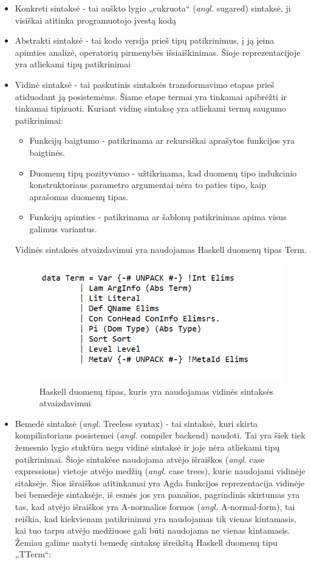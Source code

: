 \documentclass{VUMIFPSkursinis}
\begin{document}
\begin{itemize}
	\item Konkreti sintaksė - tai auškto lygio „cukruota“ (\textit{angl.} sugared) sintaksė, ji visiškai atitinka programuotojo įvestą kodą
	\item Abstrakti sintaksė - tai kodo versija prieš tipų patikrinimus, į ją įeina apimties analizė, operatorių pirmenybės išsiaiškinimas. Šioje reprezentacijoje yra atliekami tipų patikrinimai
	\item Vidinė sintaksė - tai paskutinis sintaksės transformavimo etapas prieš atiduodant ją posistemėms. Šiame etape termai yra tinkamai apibrėžti ir tinkamai tipizuoti. Kuriant vidinę sintaksę yra atliekami termų saugumo patikrinimai:
	\begin{itemize}
		\item Funkcijų baigtumo - patikrinama ar rekursiškai aprašytos funkcijos yra baigtinės.
		\item Duomenų tipų pozityvumo - užtikrinama, kad duomenų tipo indukcinio konstruktoriaus parametro argumentai nėra to paties tipo, kaip aprašomas duomenų tipas.
		\item Funkcijų apimties - patikrinama ar šablonų patikrinimas apima visus galimus variantus.
	\end{itemize}
	Vidinės sintaksės atvaizdavimui yra naudojamas Haskell duomenų tipas Term.
	\begin{figure}[H]
		\centering
		\includegraphics{HaskellTerm.png}
		\caption{Haskell duomenų tipas, kuris yra naudojamas vidinės sintaksės atvaizdavimui}
		\centering
		\end{figure}
		\item Bemedė sintaksė (\textit{angl.} Treeless syntax) - tai sintaksė, kuri skirta kompiliatoriaus posistemei (\textit{angl.} compiler backend) naudoti. Tai yra šiek tiek žemesnio lygio stuktūra negu vidinė sintaksė ir joje nėra atliekami tipų patikrinimai. Šioje sintakėse naudojama atvėjo išraiškos (\textit{angl.} case expressions) vietoje atvėjo medžių (\textit{angl.} case trees), kurie naudojami vidinėje sitaksėje. Šios išraiškos atitinkamai yra Agda funkcijos reprezentacija vidinėje bei bemedėje sintaksėje, iš esmės jos yra panašios, pagrindinis skirtumas yra tas, kad atvėjo išraiškos yra A-normalios formos (\textit{angl.} A-normal-form), tai reiškia, kad kiekvienam patikrinimui yra naudojamas tik vienas kintamasis, kai tuo tarpu atvėjo medžiuose gali būti naudojama ne vienas kintamasis. Žemiau galime matyti bemedę sintaksę išreikštą Haskell duomenų tipu „TTerm“:

\end{itemize}
\end{document}
